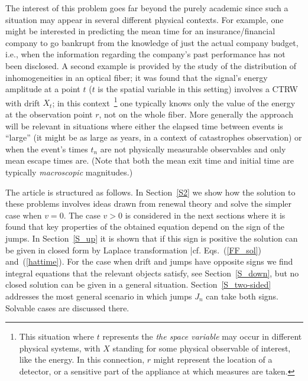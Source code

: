 \documentclass[english,aps,a4paper,twocolumn,showpacs,showkeys,amsfonts,amsmath,amssymb,amscd,nofootinbib]{revtex4}
\newcommand{\1}{\'\i}
\begin{document}
The interest of this problem goes far beyond the purely academic
 since  such a situation  may  appear in
several different physical contexts. For example, one might be
interested in predicting the mean time  for an
insurance/financial  company to go bankrupt   from the knowledge
of just the actual  company budget, i.e.,  when the information
regarding the company's past performance has not been disclosed.
A second example is provided by the  study of   the distribution
of inhomogeneities in an optical fiber;   it was  found  \cite{VM1}    that the signal's energy  amplitude at a point $t$
($t$ is the spatial variable in this setting)  involves  a CTRW
with drift $X_t$; in this context~\footnote{This situation where
$t$ represents the {\it the space variable } may occur in
different physical systems,
 with  $X$ standing  for some physical observable of interest,
like the energy. In  this connection, $r$ might represent the
location of a detector, or a sensitive part of the appliance at
which measures are taken.}  one typically knows only the value of
the  energy at the observation point $r$, not on the whole fiber.
More generally the approach will be relevant in situations where
  either the elapsed time between events  is ``large''  (it might be as large as
  years, in a context of catastrophes observation)
   or when the event's times $t_n$ are not physically
measurable  observables and only mean escape times are. (Note that
both the mean exit time and initial time are typically   {\it
macroscopic\/} magnitudes.)


 The article is structured as follows. In Section~\ref{S2} we show how the solution to these problems involves ideas drawn from renewal theory
 and solve the simpler case when $v=0$. The case $v>0$ is
 considered in the next sections where it is found that %
 key properties of the obtained equation depend on the sign of the
 jumps. In Section~\ref{S_up} it is shown  that if this sign is positive the solution can be
 given in closed form by Laplace transformation |cf.
 Eqs.~(\ref{FF_sol}) and~(\ref{hattime}). For the case  when drift and jumps have opposite signs
  we find integral equations  that  the relevant objects satisfy, see Section~\ref{S_down}, but no closed
 solution can be given in a general  situation. Section~\ref{S_two-sided}
 addresses the most general scenario in which
 jumps  $J_n$   can   take both signs.   Solvable cases are
 discussed there.
\end{document}

